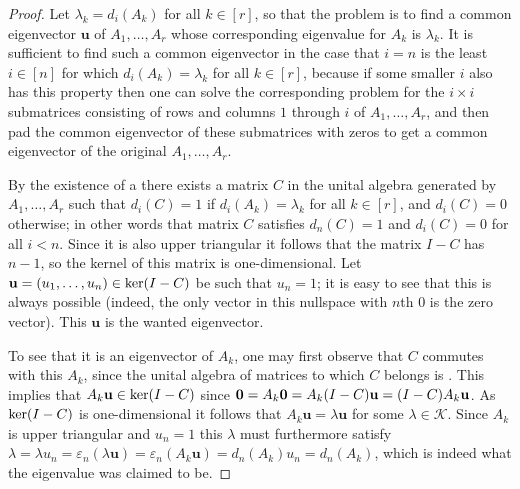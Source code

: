 \documentclass[12pt]{article}
\newcommand{\mc}{\mathcal}
\newcommand{\vek}{\mathbf}
\begin{document}
\begin{proof}
  Let \(\lambda_k = d_i(A_k)\) for all \(k \in [r]\), so that the 
  problem is to find a common eigenvector $\vek{u}$ of $A_1,\dotsc,A_r$ 
  whose corresponding eigenvalue for $A_k$ is $\lambda_k$. It is 
  sufficient to find such a common eigenvector in the case that 
  \(i=n\) is the least \(i \in [n]\) for which \(d_i(A_k) = \lambda_k\) 
  for all \(k \in [r]\), because if some smaller $i$ also 
  has this property then one can solve the corresponding problem for 
  the $i \times i$ submatrices consisting of rows and columns $1$ 
  through $i$ of $A_1,\dotsc,A_r$, and then pad the common eigenvector 
  of these submatrices with zeros to get a common eigenvector of the 
  original $A_1,\dotsc,A_r$.
  
  By the existence of a 
  there exists a matrix $C$ in the unital algebra 
  generated by $A_1,\dotsc,A_r$ such that \(d_i(C)=1\) if 
  \(d_i(A_k)=\lambda_k\) for all \(k \in [r]\), and \(d_i(C)=0\) 
  otherwise; in other words that matrix $C$ satisfies \(d_n(C)=1\) and 
  \(d_i(C)=0\) for all \(i<n\). Since it is also upper triangular it 
  follows that the matrix $I-C$ has 
  $n-1$, so the kernel of this 
  matrix is one-dimensional. Let \(\vek{u} = (u_1,\dotsc,u_n) \in 
  \ker(I -\nobreak C)\) be such that \(u_n=1\); it is easy to see that 
  this is always possible (indeed, the only vector in this nullspace 
  with $n$th 
  $0$ is the zero vector). This $\vek{u}$ is the 
  wanted eigenvector.
  
  To see that it is an eigenvector of $A_k$, one may first observe 
  that $C$ commutes with this $A_k$, since the unital algebra of 
  matrices to which $C$ belongs is 
  . This implies that 
  \(A_k \vek{u} \in \ker (I -\nobreak C)\) since \(\vek{0} = 
  A_k \vek{0} = A_k (I -\nobreak C) \vek{u} = 
  (I -\nobreak C) A_k \vek{u}\). As $\ker (I -\nobreak C)$ is 
  one-dimensional it follows that \(A_k \vek{u} = \lambda \vek{u}\) 
  for some \(\lambda \in \mc{K}\). Since $A_k$ is upper triangular 
  and \(u_n=1\) this $\lambda$ must furthermore satisfy 
  \(\lambda = \lambda u_n = \varepsilon_n(\lambda\vek{u}) = 
  \varepsilon_n(A_k\vek{u}) = d_n(A_k) u_n = d_n(A_k)\), which is 
  indeed what the eigenvalue was claimed to be.
\end{proof}
\end{document}

